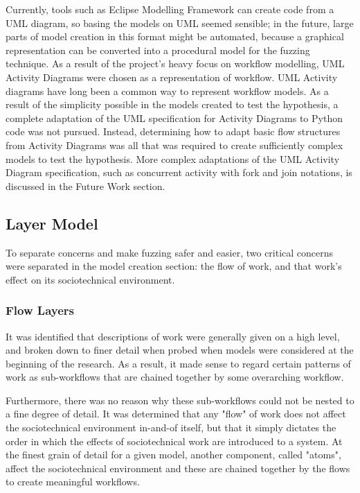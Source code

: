 Currently, tools such as Eclipse Modelling Framework\cite{EMFManual} can create code from a UML diagram, so basing the models on UML seemed sensible; in the future, large parts of model creation in this format might be automated, because a graphical representation can be converted into a procedural model for the fuzzing technique. As a result of the project's heavy focus on workflow modelling, UML Activity Diagrams\cite{Omg2010} were chosen as a representation of workflow. UML Activity diagrams have long been a common way to represent workflow models\cite{Gogolla2001}. As a result of the simplicity possible in the models created to test the hypothesis, a complete adaptation of the UML specification for Activity Diagrams to Python code was not pursued. Instead, determining how to adapt basic flow structures from Activity Diagrams was all that was required to create sufficiently complex models to test the hypothesis. More complex adaptations of the UML Activity Diagram specification, such as concurrent activity with fork and join notations, is discussed in the Future Work section. \par%

\subsection{Layer Model}%
To separate concerns and make fuzzing safer and easier, two critical concerns were separated in the model creation section: the flow of work, and that work's effect on its sociotechnical environment. \par

\subsubsection{Flow Layers}
It was identified that descriptions of work were generally given on a high level, and broken down to finer detail when probed when models were considered at the beginning of the research. As a result, it made sense to regard certain patterns of work as sub-workflows that are chained together by some overarching workflow. \par

Furthermore, there was no reason why these sub-workflows could not be nested to a fine degree of detail. It was determined that any "flow" of work does not affect the sociotechnical environment in-and-of itself, but that it simply dictates the order in which the effects of sociotechnical work are introduced to a system. At the finest grain of detail for a given model, another component, called "atoms", affect the sociotechnical environment and these are chained together by the flows to create meaningful workflows. \par

